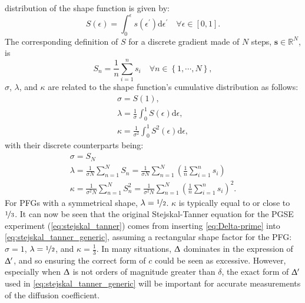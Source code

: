 distribution of the shape function is given by:
\begin{equation}
    S(\epsilon) = \int_0^{\epsilon} s\left(\epsilon^{\prime}\right)
            \mathrm{d} \epsilon^{\prime} \quad \forall \epsilon \in [0, 1].
\end{equation}
The corresponding definition of $S$ for a discrete gradient made of $N$
steps, $\symbf{s} \in \mathbb{R}^{N}$, is
\begin{equation}
    S_n =
        \frac{1}{n} \sum_{i = 1}^{n} s_i \quad
        \forall n \in \left\lbrace 1, \cdots, N\right\rbrace,
\end{equation}
$\sigma$, $\lambda$, and $\kappa$ are related to the shape function's
cumulative distribution as follows:
\begin{subequations}
    \begin{gather}
        \sigma = S(1),\\
        \lambda = \frac{1}{\sigma} \int_0^1 S(\epsilon) \mathrm{d} \epsilon,\\
        \kappa = \frac{1}{\sigma^2} \int_0^1 S^2(\epsilon) \mathrm{d} \epsilon,
    \end{gather}
\end{subequations}
with their discrete counterparts being:
\begin{subequations}
    \begin{gather}
        \sigma = S_{N} \\
        \lambda = \frac{1}{\sigma N} \sum_{n = 1}^{N} S_n
            = \frac{1}{\sigma N} \sum_{n=1}^{N}
            \left(\frac{1}{n} \sum_{i=1}^{n} s_i\right) \\
        \kappa = \frac{1}{\sigma^2 N} \sum_{n = 1}^{N} S^2_n
            = \frac{1}{\sigma^2 N} \sum_{n = 1}^{N}
            \left(\frac{1}{n} \sum_{i=1}^{n} s_i\right)^2.
    \end{gather}
\end{subequations}
For \acp{PFG} with a symmetrical shape, $\lambda = \nicefrac{1}{2}$. $\kappa$
is typically equal to or close to $\nicefrac{1}{3}$. It can now be seen that
the original Stejskal-Tanner equation for the
\ac{PGSE} experiment (\cref{eq:stejskal_tanner}) comes from
inserting \cref{eq:Delta-prime} into \cref{eq:stejskal_tanner_generic},
assuming a rectangular shape factor for the \acs{PFG}:
$\sigma = 1$,  $\lambda = \nicefrac{1}{2}$, and  $\kappa = \frac{1}{3}$.
In many situations,  $\Updelta$
dominates in the expression of $\Updelta^{\prime}$, and so ensuring the correct
form of $c$ could be seen as excessive. However, especially when  $\Updelta$ is
not orders of magnitude greater than $\delta$, the exact form of
$\Updelta^{\prime}$ used in \cref{eq:stejskal_tanner_generic} will be
important for accurate measurements of the diffusion coefficient.

